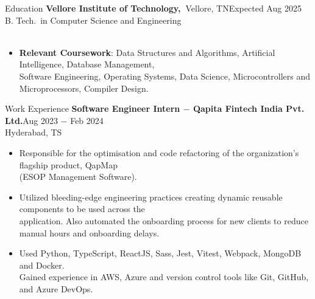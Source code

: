 \documentclass{resume}
\begin{document}
\vspace{-\baselineskip}


\begin{rSection}{Education}
      \textbf{Vellore Institute of Technology,~}{Vellore, TN}\hfill {Expected Aug 2025}
      \\ {B. Tech.\ in Computer Science and Engineering}\\ \
      \vspace{-\parskip}
      \vspace{-\parsep}
      \begin{itemize}
            \vspace{-0.5\baselineskip}
            \item {
                  \textbf{Relevant Coursework}: {Data Structures and Algorithms, Artificial Intelligence, Database Management, \\
                  Software Engineering, Operating Systems, Data Science, Microcontrollers and Microprocessors, Compiler Design.}
                  }
      \end{itemize}
\end{rSection}


\vspace{-0.5\baselineskip}


\begin{rSection}{Work Experience}
      {\textbf{Software Engineer Intern $-$ Qapita Fintech India Pvt. Ltd.}}\hfill Aug 2023 $-$ Feb 2024\\
      {Hyderabad, TS}
      \vspace{-0.5\baselineskip}
      \begin{itemize}
            \item {
                  Responsible for the optimisation and code refactoring of the organization's flagship product, QapMap \\
                  (ESOP Management Software).
                  }
            \item {
                  Utilized bleeding-edge engineering practices creating dynamic reusable components to be used across the \\
                  application. Also automated the onboarding process for new clients to reduce manual hours and onboarding delays.
                  }
            \item {
                  Used Python, TypeScript, ReactJS, Sass, Jest, Vitest, Webpack, MongoDB and Docker. \\
                  Gained experience in AWS, Azure and version control tools like Git, GitHub, and Azure DevOps.
                  }
      \end{itemize}
\end{rSection}
\end{document}
